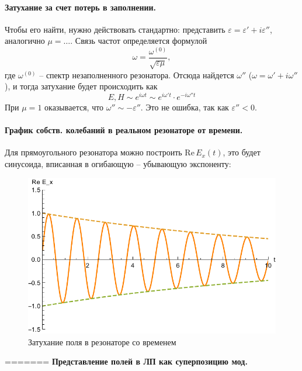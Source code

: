 \documentclass[a4paper,14pt]{extarticle}
\begin{document}
\paragraph{Затухание за счет потерь в заполнении.} Чтобы его найти, нужно действовать стандартно: представить 
$\varepsilon=\varepsilon'+i \varepsilon''$, аналогично $\mu=\ldots$. Связь частот определяется формулой
\begin{equation}
	\omega=\frac{\omega^{(0)}}{\sqrt{\varepsilon \mu}},
\end{equation}
где $\omega^{(0)}$ -- спектр незаполненного резонатора. Отсюда найдется $\omega''$ ($\omega=\omega'+i \omega''$), и тогда затухание будет происходить как 
\begin{equation}
	E,H  \sim e^{i \omega t} \sim e^{i \omega' t}\cdot e^{-i \omega'' t}
\end{equation}
При $\mu=1$ оказывается, что $\omega''\sim -\varepsilon''$. Это не ошибка, так как $\varepsilon''<0$. %
\paragraph{График собств. колебаний в реальном резонаторе от времени.} Для прямоугольного резонатора можно построить $\mathrm{Re}\, E_x(t)$, это будет синусоида, вписанная в огибающую -- убывающую экспоненту:
\begin{figure}[H]
	\centering
	\includegraphics[scale=1]{img2/exp.pdf}
	\caption{Затухание поля в резонаторе со временем}
	\label{fig:figure1}
\end{figure}

=======
	\newpage
	\hypertarget{num13}{}
	\textbf{Представление полей в ЛП как суперпозицию мод.}
\end{document}
